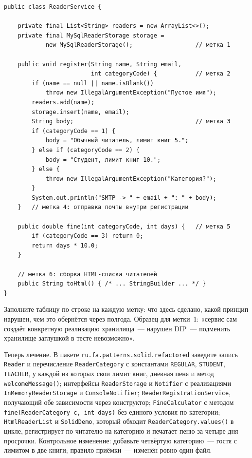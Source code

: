 \begin{listing}[H]
\begin{verbatim}
public class ReaderService {

    private final List<String> readers = new ArrayList<>();
    private final MySqlReaderStorage storage =
            new MySqlReaderStorage();                  // метка 1

    public void register(String name, String email,
                         int categoryCode) {           // метка 2
        if (name == null || name.isBlank())
            throw new IllegalArgumentException("Пустое имя");
        readers.add(name);
        storage.insert(name, email);
        String body;                                   // метка 3
        if (categoryCode == 1) {
            body = "Обычный читатель, лимит книг 5.";
        } else if (categoryCode == 2) {
            body = "Студент, лимит книг 10.";
        } else {
            throw new IllegalArgumentException("Категория?");
        }
        System.out.println("SMTP -> " + email + ": " + body);
    }   // метка 4: отправка почты внутри регистрации

    public double fine(int categoryCode, int days) {   // метка 5
        if (categoryCode == 3) return 0;
        return days * 10.0;
    }

    // метка 6: сборка HTML-списка читателей
    public String toHtml() { /* ... StringBuilder ... */ }
}
\end{verbatim}
\caption{Код для разбора: шесть помеченных мест}
\label{lst:11-16}
\end{listing}

Заполните таблицу по строке на каждую метку: что здесь сделано, какой принцип
нарушен, чем это обернётся через полгода. Образец для метки~1: «сервис сам
создаёт конкретную реализацию хранилища~--- нарушен DIP~--- подменить хранилище
заглушкой в тесте невозможно».

Теперь лечение. В пакете \texttt{ru.fa.patterns.solid.refactored} заведите
запись \texttt{Reader} и перечисление \texttt{ReaderCategory} с константами
\texttt{REGULAR}, \texttt{STUDENT}, \texttt{TEACHER}, у каждой из которых свои
лимит книг, дневная пеня и метод \texttt{welcomeMessage()}; интерфейсы
\texttt{ReaderStorage} и \texttt{Notifier} с реализациями
\texttt{InMemoryReaderStorage} и \texttt{ConsoleNotifier};
\texttt{ReaderRegistrationService}, получающий обе зависимости через
конструктор; \texttt{FineCalculator} с методом
\texttt{fine(ReaderCategory c, int days)} без единого условия по категории;
\texttt{HtmlReaderList} и \texttt{SolidDemo}, который обходит
\texttt{ReaderCategory.values()} в цикле, регистрирует по читателю на категорию
и печатает пеню за четыре дня просрочки. Контрольное изменение: добавьте
четвёртую категорию~--- гостя с лимитом в две книги; правило приёмки~--- изменён
ровно один файл.

